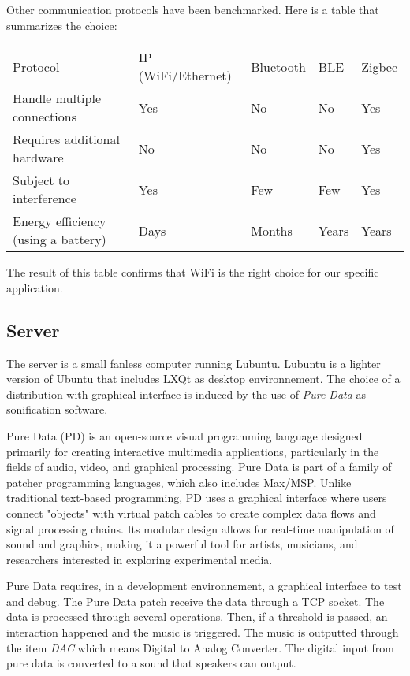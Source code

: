 Other communication protocols have been benchmarked. Here is a table that summarizes
the choice: 

\begin{table}[h!]
    \begin{tabular}{lllll}
    Protocol                            & IP (WiFi/Ethernet) & Bluetooth & BLE   & Zigbee \\
    Handle multiple connections         & Yes                & No        & No    & Yes    \\
    Requires additional hardware        & No                 & No        & No    & Yes    \\
    Subject to interference             & Yes                & Few       & Few   & Yes    \\
    Energy efficiency (using a battery) & Days               & Months    & Years & Years 
    \end{tabular}
\end{table}

The result of this table confirms that WiFi is the right choice for our specific application.
\subsection{Server}

The server is a small fanless computer running Lubuntu. Lubuntu is a lighter version of Ubuntu
that includes LXQt as desktop environnement. The choice of a distribution with graphical
interface is induced by the use of \textit{Pure Data} as sonification software.

Pure Data (PD) is an open-source visual programming language designed primarily for 
creating interactive multimedia applications, particularly in the fields of audio, video, 
and graphical processing.
Pure Data is part of a family of patcher programming languages, which also includes Max/MSP.
Unlike traditional text-based programming, PD uses a graphical interface where users connect 
"objects" with virtual patch cables to create complex data flows and signal processing chains. 
Its modular design allows for real-time manipulation of sound and graphics, making it a powerful 
tool for artists, musicians, and researchers interested in exploring experimental media. 

Pure Data requires, in a development environnement, a graphical interface to test and debug.
The Pure Data patch receive the data through a TCP socket. The data is processed through several 
operations. Then, if a threshold is passed, an interaction happened and the music is triggered.
The music is outputted through the item \textit{DAC} which means Digital to Analog Converter. 
The digital input from pure data is converted to a sound that speakers can output.

